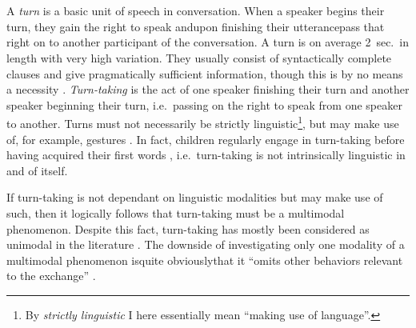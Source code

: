 
\chapter{\introduction}
\label{ch:introduction}
A \emph{turn} is a basic unit of speech in conversation.
When a speaker begins their turn, they gain the right to speak and\dash upon finishing their utterance\dash pass that right on to another participant of the conversation.
A turn is on average 2~sec.\ in length with very high variation.
They usually consist of syntactically complete clauses and give pragmatically sufficient information, though this is by no means a necessity \citep[]{levinson16}.
\emph{Turn-taking} is the act of one speaker finishing their turn and another speaker beginning their turn, i.e.\ passing on the right to speak from one speaker to another.
Turns must not necessarily be strictly linguistic\footnote{By \emph{strictly linguistic} I here essentially mean ``making use of language''.}, but may make use of, for example, gestures \citep{missingsource}. %
In fact, children regularly engage in turn-taking before having acquired their first words \citep[]{casillas16}, i.e.\ turn-taking is not intrinsically linguistic in and of itself.

If turn-taking is not dependant on linguistic modalities but may make use of such, then it logically follows that turn-taking must be a multimodal phenomenon.
Despite this fact, turn-taking has mostly been considered as unimodal in the literature \citep[]{rohlfing18}.
The downside of investigating only one modality of a multimodal phenomenon is\dash quite obviously\dash that it ``omits other behaviors relevant to the exchange'' \citep[]{rohlfing18}.

